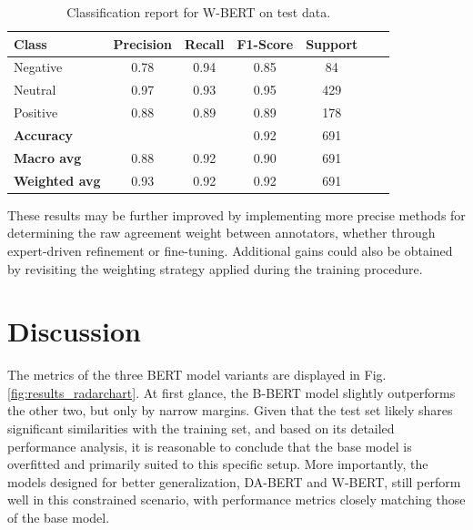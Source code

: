 \documentclass[conference]{IEEEtran}
\begin{document}
\begin{table}[H]
\centering
\caption{Classification report for W-BERT on test data.}
\label{cr_wbert_test}
\begin{tabular}{lcccccc}
\toprule
\textbf{Class} & \textbf{Precision} & \textbf{Recall} & \textbf{F1-Score} & \textbf{Support} \\
\midrule
Negative & 0.78 & 0.94 & 0.85 & 84 \\
Neutral & 0.97 & 0.93 & 0.95 & 429 \\
Positive & 0.88 & 0.89 & 0.89 & 178 \\
\midrule
\textbf{Accuracy} &  &  & 0.92 & 691 \\
\textbf{Macro avg} & 0.88 & 0.92 & 0.90 & 691 \\
\textbf{Weighted avg} & 0.93 & 0.92 & 0.92 & 691 \\
\bottomrule
\end{tabular}
\end{table}

These results may be further improved by implementing more precise methods for determining the raw agreement weight between annotators, whether through expert-driven refinement or fine-tuning. Additional gains could also be obtained by revisiting the weighting strategy applied during the training procedure.

\section{Discussion}

The metrics of the three BERT model variants are displayed in Fig. \ref{fig:results_radarchart}. At first glance, the B-BERT model slightly outperforms the other two, but only by narrow margins. Given that the test set likely shares significant similarities with the training set, and based on its detailed performance analysis, it is reasonable to conclude that the base model is overfitted and primarily suited to this specific setup. More importantly, the models designed for better generalization, DA-BERT and W-BERT, still perform well in this constrained scenario, with performance metrics closely matching those of the base model.
\end{document}
